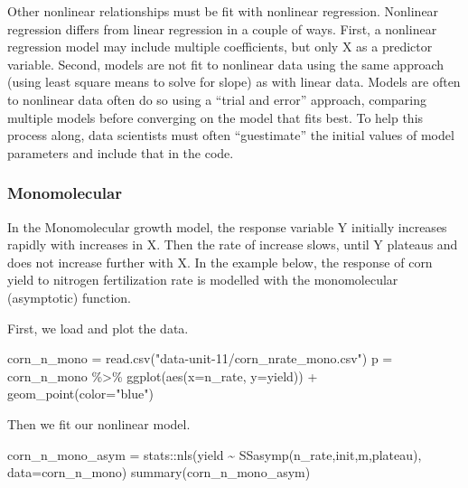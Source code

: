 \documentclass[
]{book}
\newenvironment{Shaded}{\begin{snugshade}}{\end{snugshade}}
\newcommand{\AttributeTok}[1]{\textcolor[rgb]{0.77,0.63,0.00}{#1}}
\newcommand{\FunctionTok}[1]{\textcolor[rgb]{0.00,0.00,0.00}{#1}}
\newcommand{\NormalTok}[1]{#1}
\newcommand{\OtherTok}[1]{\textcolor[rgb]{0.56,0.35,0.01}{#1}}
\newcommand{\SpecialCharTok}[1]{\textcolor[rgb]{0.00,0.00,0.00}{#1}}
\newcommand{\StringTok}[1]{\textcolor[rgb]{0.31,0.60,0.02}{#1}}
\begin{document}
Other nonlinear relationships must be fit with nonlinear regression. Nonlinear regression differs from linear regression in a couple of ways. First, a nonlinear regression model may include multiple coefficients, but only X as a predictor variable. Second, models are not fit to nonlinear data using the same approach (using least square means to solve for slope) as with linear data. Models are often to nonlinear data often do so using a ``trial and error'' approach, comparing multiple models before converging on the model that fits best. To help this process along, data scientists must often ``guestimate'' the initial values of model parameters and include that in the code.

\hypertarget{monomolecular}{%
\subsubsection{Monomolecular}\label{monomolecular}}

In the Monomolecular growth model, the response variable Y initially increases rapidly with increases in X. Then the rate of increase slows, until Y plateaus and does not increase further with X. In the example below, the response of corn yield to nitrogen fertilization rate is modelled with the monomolecular (asymptotic) function.

First, we load and plot the data.

\begin{Shaded}
\begin{Highlighting}[]
\NormalTok{corn\_n\_mono }\OtherTok{=} \FunctionTok{read.csv}\NormalTok{(}\StringTok{"data{-}unit{-}11/corn\_nrate\_mono.csv"}\NormalTok{)}
\NormalTok{p }\OtherTok{=}\NormalTok{ corn\_n\_mono }\SpecialCharTok{\%\textgreater{}\%}
  \FunctionTok{ggplot}\NormalTok{(}\FunctionTok{aes}\NormalTok{(}\AttributeTok{x=}\NormalTok{n\_rate, }\AttributeTok{y=}\NormalTok{yield)) }\SpecialCharTok{+}
  \FunctionTok{geom\_point}\NormalTok{(}\AttributeTok{color=}\StringTok{"blue"}\NormalTok{)}
\end{Highlighting}
\end{Shaded}

Then we fit our nonlinear model.

\begin{Shaded}
\begin{Highlighting}[]
\NormalTok{corn\_n\_mono\_asym }\OtherTok{=}\NormalTok{ stats}\SpecialCharTok{::}\FunctionTok{nls}\NormalTok{(yield }\SpecialCharTok{\textasciitilde{}} \FunctionTok{SSasymp}\NormalTok{(n\_rate,init,m,plateau), }\AttributeTok{data=}\NormalTok{corn\_n\_mono)}
\FunctionTok{summary}\NormalTok{(corn\_n\_mono\_asym)}
\end{Highlighting}
\end{Shaded}
\end{document}
